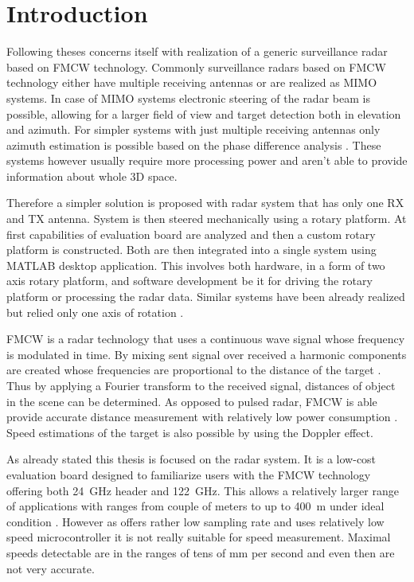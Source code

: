 
\chapter*{Introduction}

Following theses concerns itself with realization of a generic surveillance radar based on FMCW technology.
Commonly surveillance radars based on FMCW technology either have multiple receiving antennas or are realized as MIMO systems.
In case of MIMO systems electronic steering of the radar beam is possible, allowing for a larger field of view and target detection both in elevation and azimuth.
For simpler systems with just multiple receiving antennas only azimuth estimation is possible based on the phase difference analysis \cite{sandeep2018}.
These systems however usually require more processing power and aren't able to provide information about whole 3D space.

Therefore a simpler solution is proposed with radar system that has only one RX and TX antenna.
System is then steered mechanically using a rotary platform.
At first capabilities of \sidar evaluation board are analyzed and then a custom rotary platform is constructed.
Both are then integrated into a single system using MATLAB desktop application.
This involves both hardware, in a form of two axis rotary platform, and software development be it for driving the rotary platform or processing the radar data.
Similar systems have been already realized but relied only one axis of rotation \cite{nowok2017, vivet2013}.

FMCW is a radar technology that uses a continuous wave signal whose frequency is modulated in time.
By mixing sent signal over received a harmonic components are created whose frequencies are proportional to the distance of the target \cite{graham2005}.
Thus by applying a Fourier transform to the received signal, distances of object in the scene can be determined.
As opposed to pulsed radar, FMCW is able provide accurate distance measurement with relatively low power consumption \cite{jankiraman2018}.
Speed estimations of the target is also possible by using the Doppler effect.


As already stated this thesis is focused on the \sidar radar system.
It is a low-cost evaluation board designed to familiarize users with the FMCW technology offering both 24~GHz header and 122~GHz\cite{sidarMAN}.
This allows a relatively larger range of applications with ranges from couple of meters to up to 400~m under ideal condition \cite{sidarMANOld}.
However as \sidar offers rather low sampling rate and uses relatively low speed microcontroller it is not really suitable for speed measurement.
Maximal speeds detectable are in the ranges of tens of mm per second and even then are not very accurate.

